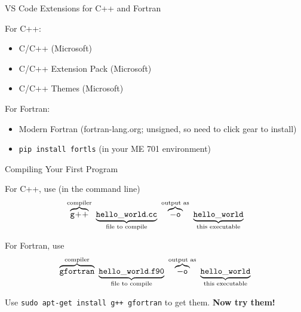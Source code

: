 \documentclass[aspectratio=1610]{beamer}
\begin{document}
\begin{frame}{VS Code Extensions for C++ and Fortran}

For C++:
\begin{itemize}
 \item C/C++ (Microsoft)
 \item C/C++ Extension Pack (Microsoft)
 \item C/C++ Themes (Microsoft)
\end{itemize}

\vfill 

For Fortran:
\begin{itemize}
 \item Modern Fortran (fortran-lang.org; unsigned, so need to click gear to install)
 \item {\tt pip install fortls} (in your ME 701 environment)
\end{itemize}

\end{frame}

\begin{frame}{Compiling Your First Program}

For C++, use (in the command line)
\begin{equation*}
 \overbrace{\tt g\!+\!+}^{\text{compiler}}~
   \underbrace{\tt{hello\_world.cc}}_{\text{file to compile}}~
     \overbrace{\tt{-o}}^{\text{output as}}~
       \underbrace{\tt{hello\_world}}_{\text{this executable}} 
\end{equation*}
\vfill 

For Fortran, use
\begin{equation*}
 \overbrace{\tt gfortran}^{\text{compiler}}~
   \underbrace{\tt{hello\_world.f90}}_{\text{file to compile}}~
     \overbrace{\tt{-o}}^{\text{output as}}~
       \underbrace{\tt{hello\_world}}_{\text{this executable}} 
\end{equation*}

\vfill 
Use \textcolor{wcprimary}{{\tt sudo apt-get install g++ gfortran}} to get them.
{\bf Now try them!}

\end{frame}
\end{document}

